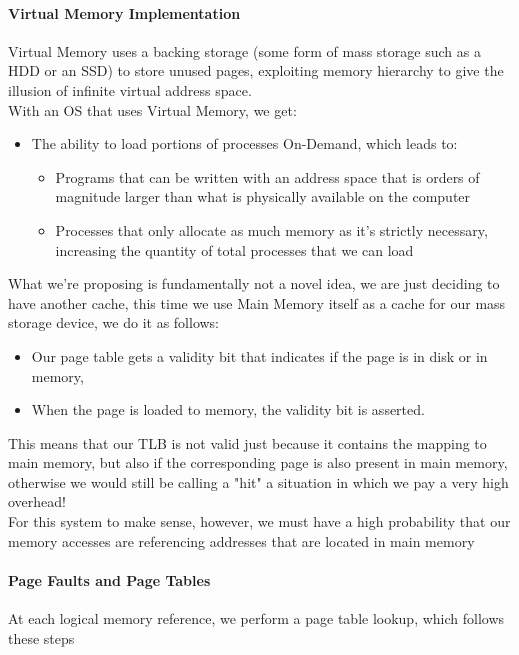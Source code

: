 \documentclass[openright, twoside]{report}
\theoremstyle{definition}
\theoremstyle{example}
\begin{document}
\paragraph{Virtual Memory Implementation}
Virtual Memory uses a backing storage (some form of mass storage such as a HDD or an SSD) to store 
unused pages, exploiting memory hierarchy to give the illusion of infinite virtual address space.\\

With an OS that uses Virtual Memory, we get: 

\begin{itemize}
	\item The ability to load portions of processes On-Demand, which leads to:
	\begin{itemize}
		\item Programs that can be written with an address space that is orders of magnitude larger 
		than what is physically available on the computer
		\item Processes that only allocate as much memory as it's strictly necessary, increasing the 
		quantity of total processes that we can load
	\end{itemize}
\end{itemize}

What we're proposing is fundamentally not a novel idea, we are just deciding to have another 
cache, this time we use Main Memory itself as a cache for our mass storage device, we do it as follows:

\begin{itemize}
	\item Our page table gets a validity bit that indicates if the page is in disk or in memory,
	\item When the page is loaded to memory, the validity bit is asserted.
\end{itemize}

This means that our TLB is not valid just because it contains the mapping to main memory, but 
also if the corresponding page is also present in main memory, otherwise we would still be calling 
a "hit" a situation in which we pay a very high overhead!\\

For this system to make sense, however, we must have a high probability that our memory accesses are 
referencing addresses that are located in main memory

\paragraph{Page Faults and Page Tables}
At each logical memory reference, we perform a page table lookup, which follows these steps
\end{document}
